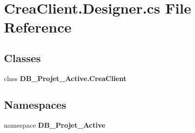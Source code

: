 \section{Crea\+Client.\+Designer.\+cs File Reference}
\label{_crea_client_8_designer_8cs}
\subsection*{Classes}
\begin{DoxyCompactItemize}
\item 
class \textbf{ D\+B\+\_\+\+Projet\+\_\+\+Active.\+Crea\+Client}
\end{DoxyCompactItemize}
\subsection*{Namespaces}
\begin{DoxyCompactItemize}
\item 
namespace \textbf{ D\+B\+\_\+\+Projet\+\_\+\+Active}
\end{DoxyCompactItemize}
